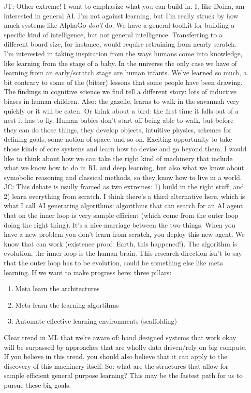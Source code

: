 JT: Other extreme! I want to emphasize what you can build in. I, like Doina, am interested in general AI. I'm not against learning, but I'm really struck by how much systems like AlphaGo {\it don't} do. We have a general toolkit for building a specific kind of intelligence, but not general intelligence. Transferring to a different board size, for instance, would require retraining from nearly scratch. I'm interested in taking inspiration from the ways humans come into knowledge, like learning from the stage of a baby. In the universe the only case we have of learning from an early/scratch stage are human infants. We've learned so much, a bit contrary to some of the (bitter) lessons that some people have been drawing. The findings in cognitive science we find tell a different story: lots of inductive biases in human children. Also: the gazelle, learns to walk in the savannah very quickly or it will be eaten. Or think about a bird: the first time it falls out of a nest it has to fly. Human babies don't start off being able to walk, but before they can do those things, they develop objects, intuitive physics, schemes for defining goals, some notion of space, and so on. Exciting opportunity to take those kinds of core systems and learn how to devise and go beyond them. I would like to think about how we can take the right kind of machinery that include what we know how to do in RL and deep learning, but also what we know about symobolic reasoning and classical methods, so they know how to live in a world. \\

JC: This debate is usully framed as two extremes: 1) build in the right stuff, and 2) learn everything from scratch. I think there's a third alternative here, which is what I call AI generating algorithms: algorithms that can search for an AI agent that on the inner loop is very sample efficient (which come from the outer loop doing the right thing). It's a nice marriage between the two things. When you have a new problem you don't learn from scratch, you deploy this new agent. We know that can work (existence proof: Earth, this happened!). The algorithm is evolution, the inner loop is the human brain. This research direction isn't to say that the outer loop has to be evolution, could be something else like meta learning. If we want to make progress here: three pillars:
\begin{enumerate}
    \item Meta learn the architectures
    \item Meta learn the learning algortihms
    \item Automate effective learning environments (scaffolding)
\end{enumerate}
Clear trend in ML that we're aware of: hand designed systems that work okay will be surpassed by approaches that are wholly data driven/rely on big compute. If you believe in this trend, you should also believe that it can apply to the discovery of this machinery itself. So: what are the structures that allow for sample efficient general purpose learning? This may be the fastest path for us to pursue these big goals. \\

